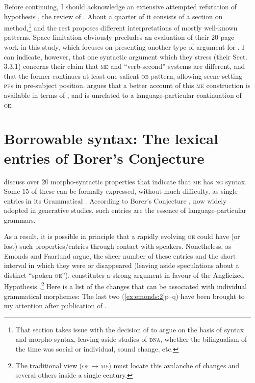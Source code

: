 \documentclass[output=paper]{LSP/langsci}
\begin{document}
  Before continuing, I should acknowledge an extensive attempted refutation of hypothesis , the review of \citet{Bech2015}. About a quarter of it consists of a section on method,\footnote{That section takes issue with the decision of \citet{EmondsFaarlund2014} to argue on the basis of syntax and morpho-syntax, leaving aside studies of \textsc{dna}, whether the bilingualism of the time was social or individual, sound change, etc.} and the rest proposes different interpretations of mostly well-known patterns. Space limitation obviously precludes an evaluation of their 20 page work in this study, which focuses on presenting another type of argument for . I can indicate, however, that one syntactic argument which they stress (their Sect. 3.3.1) concerns their claim that \textsc{me} and  ``verb-second'' systems are different, and that the former continues at least one salient \textsc{oe} pattern, allowing scene{}-setting \textsc{pp}s in pre-subject position. \citet{Emonds2016} argues that a better account of this \textsc{me} construction is available in terms of , and is unrelated to a language-particular continuation of \textsc{oe}.

\section{Borrowable syntax: The lexical entries of Borer’s Conjecture}\label{sec:emonds:4}

\citet{EmondsFaarlund2014} discuss over 20 morpho-syntactic properties that indicate that \textsc{me} has \textsc{ng} syntax. Some 15 of these can be formally expressed, without much difficulty, as single entries in its Grammatical . According to Borer’s Conjecture \citep[29]{Borer1984}, now widely adopted in generative studies, such entries are the essence of language-particular grammars.

As a result, it is possible in principle that a rapidly evolving \textsc{oe} could have  (or lost) such properties/entries through contact with  speakers. Nonetheless, as Emonds and Faarlund argue, the sheer number of these entries and the short interval in which they were  or disappeared (leaving aside speculations about a distinct ``spoken \textsc{oe}''), constitutes a strong argument in favour of the Anglicized  Hypothesis .\footnote{The traditional view (\textsc{oe} → \textsc{me}) must locate this avalanche of changes and several others inside a single century.} Here is a list of the changes that can be associated with individual grammatical morphemes: The last two (\ref{ex:emonds:2}p--q) have been brought to my attention after publication of \citet{EmondsFaarlund2014}.
\end{document}
